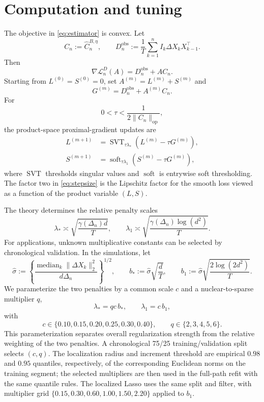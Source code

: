 \documentclass[12pt]{article}
\theoremstyle{definition}
\begin{document}
	\section{Computation and tuning} \label{sec:computation}
	
	The objective in \eqref{eq:estimator} is convex. Let
	\[C_n:=\widehat C_n^{B,\eta},\qquad D_n^{\mathrm{obs}}:=\frac1T\sum_{k=1}^n I_k\Delta X_kX_{k-1}^\top. \]Then \[\nabla\mathcal L_n^D(A)=D_n^{\mathrm{obs}}+AC_n.\] Starting from $L^{(0)}=S^{(0)}=0$, set $A^{(m)}=L^{(m)}+S^{(m)}$ and \[G^{(m)}=D_n^{\mathrm{obs}}+A^{(m)}C_n.\]
	For
	\begin{equation}
		0<\tau<\frac1{2\|C_n\|_{\mathrm{op}}},\label{eq:stepsize}
	\end{equation}
	the product-space proximal-gradient updates are
	\begin{align}
		L^{(m+1)} &=\operatorname{SVT}_{\tau\lambda_*} \left(L^{(m)}-\tau G^{(m)}\right),\label{eq:svt}\\
		S^{(m+1)} &=\operatorname{soft}_{\tau\lambda_1}
		\left(S^{(m)}-\tau G^{(m)}\right),\label{eq:soft}
	\end{align}
	where $\operatorname{SVT}$ thresholds singular values and $\operatorname{soft}$ is entrywise soft thresholding. The factor two in \eqref{eq:stepsize} is the Lipschitz factor for the smooth loss viewed as a function of the product variable $(L,S)$.
	
	The theory determines the relative penalty scales
	\begin{equation}
		\lambda_*\asymp\sqrt{\frac{\gamma(\Delta_n)d}{T}},
		\qquad
		\lambda_1\asymp\sqrt{\frac{\gamma(\Delta_n)\log(d^2)}{T}}.
		\label{eq:tuning_scales}
	\end{equation}
	For applications, unknown multiplicative constants can be selected by chronological validation. In the simulations, let
	\[
	\widehat\sigma
	:=\left\{
	\frac{\operatorname{median}_k\|\Delta X_k\|_2^2}
	{d\Delta_n}
	\right\}^{1/2},
	\qquad
	b_*:=\widehat\sigma\sqrt{\frac dT},
	\qquad
	b_1:=\widehat\sigma
	\sqrt{\frac{2\log(2d^2)}T}.
	\]
	We parameterize the two penalties by a common scale $c$ and a nuclear-to-sparse multiplier $q$,
	\begin{equation}
		\lambda_*=qc\,b_*,
		\qquad
		\lambda_1=c\,b_1,
		\label{eq:cv_parameterization}
	\end{equation}
	with
	\[
	c\in\{0.10,0.15,0.20,0.25,0.30,0.40\},
	\qquad
	q\in\{2,3,4,5,6\}.
	\]
	This parameterization separates overall regularization strength from the relative weighting of the two penalties. A chronological 75/25 training/validation split selects $(c,q)$. The localization radius and increment threshold are empirical $0.98$ and $0.95$ quantiles, respectively, of the corresponding Euclidean norms on the training segment; the selected multipliers are then used in the full-path refit with the same quantile rules. The localized Lasso uses the same split and filter, with multiplier grid
	$\{0.15,0.30,0.60,1.00,1.50,2.20\}$ applied to $b_1$.
	
\end{document}
